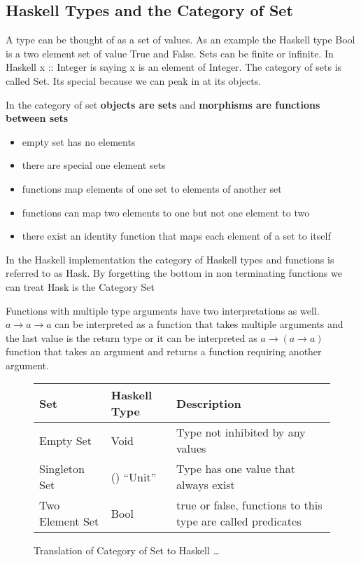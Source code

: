 \subsection{Haskell Types and the Category of Set}

A type can be thought of as a set of values. As an example the Haskell type Bool is a two element set of value True and False.
Sets can be finite or infinite.
In Haskell x :: Integer is saying x is an element of Integer.
The category of sets is called Set. Its special because we can peak in at its objects.

In the category of set \textbf{objects are sets} and \textbf{morphisms are functions between sets}

\begingroup

\begin{itemize}
    \item empty set has no elements
    \item there are special one element sets
    \item functions map elements of one set to elements of another set
    \item functions can map two elements to one but not one element to two
    \item there exist an identity function that maps each element of a set to itself
\end{itemize}

In the Haskell implementation the category of Haskell types and functions is referred to as Hask. By forgetting the bottom in non terminating functions we can treat Hask is the Category Set

Functions with multiple type arguments have two interpretations as well. $a \rightarrow a \rightarrow a$ can be interpreted as a function that takes multiple arguments and the last value is the return type or it can be interpreted as $a \rightarrow (a \rightarrow a)$ function that takes an argument and returns a function requiring another argument.

\begin{figure}[ht]
\caption{Translation of Category of Set to Haskell \ldots}
    \begin{tabularx}{0.9\textwidth} {
            | >{\centering\arraybackslash}X
            | >{\centering\arraybackslash}X
            | >{\centering\arraybackslash}X |}
        \hline
        Set             & Haskell Type & Description                                                \\
        \hline
        Empty Set       & Void         & Type not inhibited by any values                           \\
        \hline
        Singleton Set   & () ``Unit''  & Type has one value that always exist                       \\
        \hline
        Two Element Set & Bool         & true or false, functions to this type are called predicates \\
        \hline
    \end{tabularx}
\end{figure}

\endgroup
